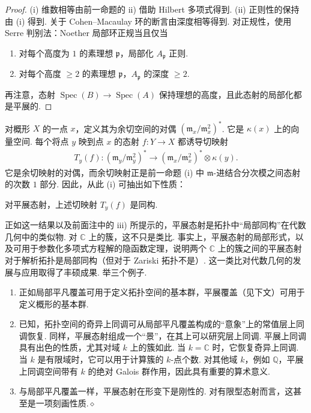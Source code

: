 \begin{proof}
\textup{(i)} 维数相等由前一命题的 ii) 借助 Hilbert 多项式得到.
\textup{(ii)} 正则性的保持由 (i) 得到. 关于 Cohen--Macaulay 环的断言由深度相等得到. 对正规性，使用 Serre 判别法：Noether 局部环正规当且仅当
\begin{enumerate}[label=\roman*)]
\item 对每个高度为 $1$ 的素理想 $\mathfrak p$，局部化 $A_{\mathfrak p}$ 正则.
\item 对每个高度 $\geqslant2$ 的素理想 $\mathfrak p$，$A_{\mathfrak p}$ 的深度 $\geqslant2$.
\end{enumerate}
再注意，态射 $\operatorname{Spec}(B)\longrightarrow\operatorname{Spec}(A)$ 保持理想的高度，且此态射的局部化都是平展的.
\end{proof}
对概形 $X$ 的一点 $x$，定义其为余切空间的对偶 $(\mathfrak m_x/\mathfrak m_x^2)^*$. 它是 $\kappa(x)$ 上的向量空间. 每个将点 $y$ 映到点 $x$ 的态射 $f:Y\longrightarrow X$ 都诱导切映射
\begin{align*}
T_y(f):(\mathfrak m_y/\mathfrak m_y^2)^*\longrightarrow(\mathfrak m_x/\mathfrak m_x^2)^*\otimes\kappa(y).
\end{align*}
它是余切映射的对偶，而余切映射正是前一命题 (i) 中 $\mathfrak m$-进结合分次模之间态射的次数 $1$ 部分. 因此，从此 (i) 可抽出如下性质：
\begin{corollary}\label{item:ag-3-3-14}
对平展态射，上述切映射 $T_y(f)$ 是同构.
\end{corollary}
\begin{remark}\label{item:ag-3-3-15}
正如这一结果以及前面注中的 iii) 所提示的，平展态射是拓扑中``局部同构''在代数几何中的类似物. 对 $\mathbb C$ 上的簇，这不只是类比. 事实上，平展态射的局部形式，以及可用于参数化多项式方程解的隐函数定理，说明两个 $\mathbb C$ 上的簇之间的平展态射对于解析拓扑是局部同构（但对于 Zariski 拓扑不是）.
这一类比对代数几何的发展与应用取得了丰硕成果. 举三个例子.
\begin{enumerate}[label=\roman*)]
\item 正如局部平凡覆盖可用于定义拓扑空间的基本群，平展覆盖（见下文）可用于定义概形的基本群.
\item 已知，拓扑空间的奇异上同调可从局部平凡覆盖构成的``意象''上的常值层上同调恢复. 同样，平展态射组成一个``景''，在其上可以研究层上同调. 平展上同调具有出色的性质，尤其对域 $k$ 上的簇如此. 当 $k=\mathbb C$ 时，它恢复奇异上同调. 当 $k$ 是有限域时，它可以用于计算簇的 $k$-点个数. 对其他域 $k$，例如 $\mathbb Q$，平展上同调空间带有 $k$ 的绝对 Galois 群作用，因此具有重要的算术意义.
\item 与局部平凡覆盖一样，平展态射在形变下是刚性的. 对有限型态射而言，这甚至是一项刻画性质.\unskip\nobreak\hfill\ensuremath{\diamond}
\end{enumerate}
\renewcommand{\envenddiamond}{}
\end{remark}
